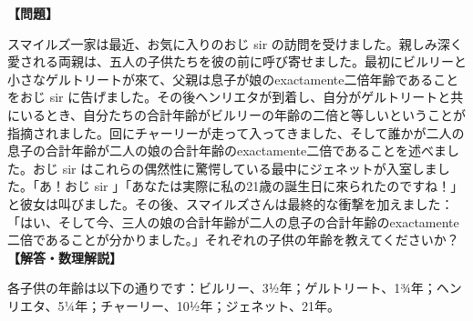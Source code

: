 \documentclass[10pt,a4paper,oneside,openany]{ltjsbook}
\begin{document}
\begin{tcolorbox}[colback=softblue,colframe=primaryblue,title=\textbf{第 42 問：ファミリーの年齢 （原題: THE FAMILY AGES.）},arc=2mm,boxrule=1pt,breakable]
\textbf{【問題】}\par\vspace{0.3em}
スマイルズ一家は最近、お気に入りのおじ sir の訪問を受けました。親しみ深く愛される両親は、五人の子供たちを彼の前に呼び寄せました。最初にビルリーと小さなゲルトリートが來て、父親は息子が娘のexactamente二倍年齢であることをおじ sir に告げました。その後ヘンリエタが到着し、自分がゲルトリートと共にいるとき、自分たちの合計年齢がビルリーの年齢の二倍と等しいということが指摘されました。回にチャーリーが走って入ってきました、そして誰かが二人の息子の合計年齢が二人の娘の合計年齢のexactamente二倍であることを述べました。おじ sir はこれらの偶然性に驚愕している最中にジェネットが入室しました。「あ！おじ sir 」「あなたは実際に私の21歳の誕生日に來られたのですね！」と彼女は叫びました。その後、スマイルズさんは最終的な衝撃を加えました：「はい、そして今、三人の娘の合計年齢が二人の息子の合計年齢のexactamente二倍であることが分かりました。」それぞれの子供の年齢を教えてくださいか？
\tcblower
\textbf{【解答・数理解説】}\par\vspace{0.3em}
各子供の年齢は以下の通りです：ビルリー、3½年；ゲルトリート、1¾年；ヘンリエタ、5¼年；チャーリー、10½年；ジェネット、21年。
\end{tcolorbox}
\end{document}
